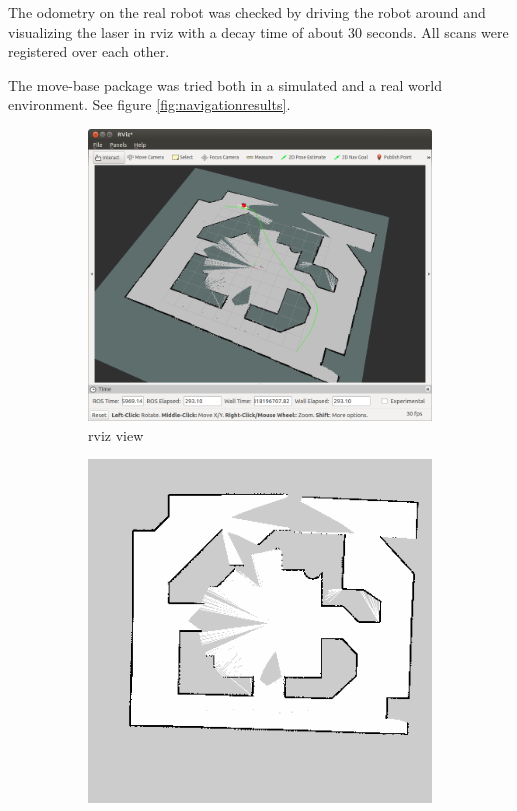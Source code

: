 \documentclass[a4paper]{article}
\begin{document}
The odometry on the real robot was checked by driving the robot around and visualizing the
laser in rviz with a decay time of about 30 seconds. All scans were registered over
each other.


The move-base package was tried both in a simulated and a real world environment.
See figure \ref{fig:navigationresults}.

\begin{figure}[h!]
  \centering
  \begin{subfigure}[b]{0.8\textwidth}
    \includegraphics[width=\textwidth,height=\textheight,keepaspectratio]{img/navigation_simulation_rviz.png}
    \caption{rviz view}
  \end{subfigure}
  \begin{subfigure}[b]{0.8\textwidth}
    \includegraphics[width=\textwidth,height=\textheight,keepaspectratio]{img/gmapping_simulation_map.png}

\end{subfigure}
\end{figure}
\end{document}
